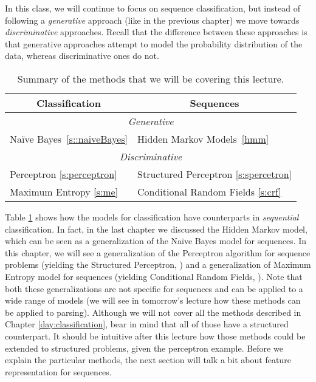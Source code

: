 In this class, we will continue to focus on sequence classification,
but instead of following a \emph{generative} approach (like in the previous
chapter) we move towards \emph{discriminative} approaches. Recall that the difference between these approaches is that generative approaches attempt to model the probability distribution of the data, whereas discriminative ones do not.

\begin{table}
\centering
\begin{tabular}{|l|l|}
\hline

\multicolumn{1}{|c|}{\textbf{Classification}} & \multicolumn{1}{|c|}{\textbf{Sequences}} \\
\hline
\multicolumn{2}{|c|}{\emph{Generative}}\\
\hline
Na\"{i}ve Bayes~\ref{s::naiveBayes} & Hidden Markov Models~\ref{hmm} \\
\hline
\multicolumn{2}{|c|}{\emph{Discriminative}}\\
\hline
Perceptron \ref{s:perceptron} & Structured Perceptron \ref{s:spercetron}\\
\hline
Maximum Entropy \ref{s:me} & Conditional Random Fields \ref{s:crf}\\
\hline
\end{tabular}
\caption{\label{disc_seq_summary}Summary of the methods that we will be covering this lecture.}
\end{table}

Table \ref{disc_seq_summary} shows how the models for classification 
have counterparts in \emph{sequential} classification. In fact, in
the last chapter we discussed the Hidden Markov model, which can be seen as a
generalization of the Na\"{i}ve Bayes model for sequences. 
In this chapter, we will see a generalization of the
Perceptron algorithm for sequence problems (yielding the Structured
Perceptron, \citealt{collins2002discriminative}) and a generalization of
Maximum Entropy model for sequences (yielding Conditional Random Fields, \citealt{lafferty2001conditional}). 
Note that both these generalizations are  not specific for sequences
and can be applied to a wide range of models (we will see in tomorrow's
lecture how these methods can be applied to parsing).
Although we will not cover all the methods described in
Chapter \ref{day:classification}, bear in mind that all of those have a structured counterpart. 
It should be intuitive after this lecture how those methods could be
extended to structured problems, given the perceptron example.
Before we explain the particular methods, the next section will talk a
bit about feature representation for sequences. 


